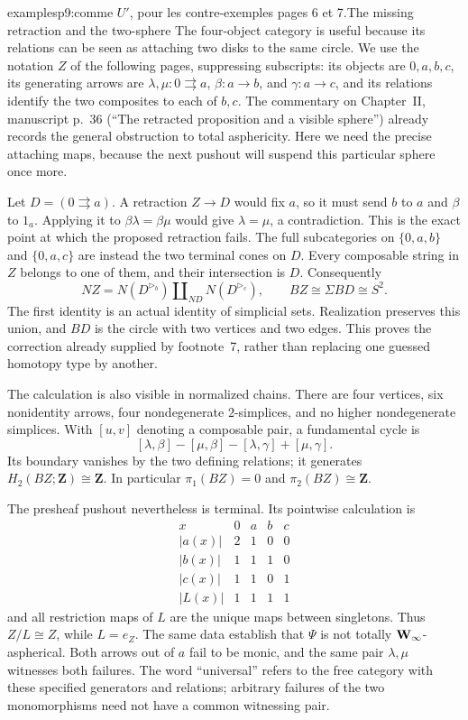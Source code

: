 \begin{dcomment}{examples}{p9:comme $U'$, pour les contre-exemples pages 6 et 7.}{The missing retraction and the two-sphere}
The four-object category is useful because its relations can be seen as attaching two disks to the same circle. We use the notation $Z$ of the following pages, suppressing subscripts: its objects are $0,a,b,c$, its generating arrows are $\lambda,\mu:0\rightrightarrows a$, $\beta:a\to b$, and $\gamma:a\to c$, and its relations identify the two composites to each of $b,c$. The commentary on Chapter~II, manuscript p.~36 (``The retracted proposition and a visible sphere'') already records the general obstruction to total asphericity. Here we need the precise attaching maps, because the next pushout will suspend this particular sphere once more.

Let $D=(0\rightrightarrows a)$. A retraction $Z\to D$ would fix $a$, so it must send $b$ to $a$ and $\beta$ to $1_a$. Applying it to $\beta\lambda=\beta\mu$ would give $\lambda=\mu$, a contradiction. This is the exact point at which the proposed retraction fails. The full subcategories on $\{0,a,b\}$ and $\{0,a,c\}$ are instead the two terminal cones on $D$. Every composable string in $Z$ belongs to one of them, and their intersection is $D$. Consequently
\[
 NZ=N(D^{\triangleright_b})\amalg_{ND}N(D^{\triangleright_c}),
 \qquad BZ\cong\Sigma BD\cong S^2.
\]
The first identity is an actual identity of simplicial sets. Realization preserves this union, and $BD$ is the circle with two vertices and two edges. This proves the correction already supplied by footnote~7, rather than replacing one guessed homotopy type by another.

The calculation is also visible in normalized chains. There are four vertices, six nonidentity arrows, four nondegenerate $2$-simplices, and no higher nondegenerate simplices. With $[u,v]$ denoting a composable pair, a fundamental cycle is
\[
 [\lambda,\beta]-[\mu,\beta]-[\lambda,\gamma]+[\mu,\gamma].
\]
Its boundary vanishes by the two defining relations; it generates $H_2(BZ;\mathbf Z)\cong\mathbf Z$. In particular $\pi_1(BZ)=0$ and $\pi_2(BZ)\cong\mathbf Z$.

The presheaf pushout nevertheless is terminal. Its pointwise calculation is
\[
\begin{array}{c|cccc}
 x&0&a&b&c\\\hline
 |a(x)|&2&1&0&0\\
 |b(x)|&1&1&1&0\\
 |c(x)|&1&1&0&1\\
 |L(x)|&1&1&1&1
\end{array}
\]
and all restriction maps of $L$ are the unique maps between singletons. Thus $Z/L\cong Z$, while $L=e_Z$. The same data establish that $\Psi$ is not totally $\mathbf{W}_{\infty}$-aspherical. Both arrows out of $a$ fail to be monic, and the same pair $\lambda,\mu$ witnesses both failures. The word ``universal'' refers to the free category with these specified generators and relations; arbitrary failures of the two monomorphisms need not have a common witnessing pair.
\end{dcomment}



